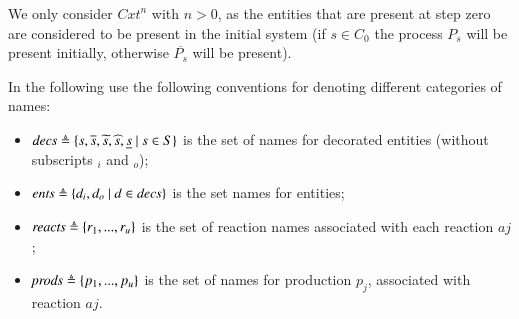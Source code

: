 



We only consider $\mathit{Cxt}^n$ with $n >0$, as the entities  that are present at step zero  are considered to be present in the initial system (if $s\in C_0$ the process $P_s$ will be present initially, otherwise $\overline{P_s}$ will be present).

In the following use the following conventions for denoting different categories of names:
\begin{itemize}
\item
$\mathit{decs} \triangleq \{ s, \overline{s}, \widetilde{s},\widehat{s},\underline{s}~|~ s\in S\}$ is the set of names for decorated entities (without subscripts $_i$ and $_o$);
\item
$\mathit{ents} \triangleq \{ d_i, d_o~|~ d\in \mathit{decs}\}$ is the set names for entities;
\item
$\mathit{reacts}\triangleq \{r_1,...,r_u\}$ is the set of reaction names associated with each reaction $aj$;
\item 
$\mathit{prods}\triangleq \{p_1,...,p_u\}$ is the set of names for production $p_j$, associated with  reaction $aj$.
\end{itemize}




